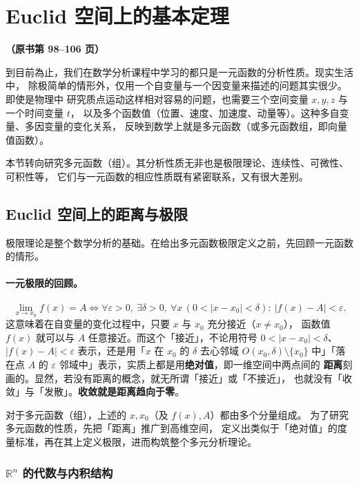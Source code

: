 \documentclass[11pt]{ctexart}
\theoremstyle{plain}
\theoremstyle{definition}
\theoremstyle{remark}
\newcommand{\srcnum}[1]{\textbf{#1}}
\begin{document}
\section{Euclid 空间上的基本定理}

\srcnum{（原书第 98--106 页）}

到目前為止，我们在数学分析课程中学习的都只是一元函数的分析性质。现实生活中，
除极简单的情形外，仅用一个自变量与一个因变量来描述的问题其实很少。即使是物理中
研究质点运动这样相对容易的问题，也需要三个空间变量 \(x,y,z\) 与一个时间变量 \(t\)，
以及多个函数值（位置、速度、加速度、动量等）。这种多自变量、多因变量的变化关系，
反映到数学上就是多元函数（或多元函数组，即向量值函数）。

本节转向研究多元函数（组）。其分析性质无非也是极限理论、连续性、可微性、可积性等，
它们与一元函数的相应性质既有紧密联系，又有很大差别。

\subsection{Euclid 空间上的距离与极限}

极限理论是整个数学分析的基础。在给出多元函数极限定义之前，先回顾一元函数的情形。

\paragraph{一元极限的回顾。}
\[
  \lim_{x\to x_0} f(x)=A
  \iff \forall \varepsilon>0,\ \exists\delta>0,\ \forall x\,(0<|x-x_0|<\delta):\
  |f(x)-A|<\varepsilon .
\]
这意味着在自变量的变化过程中，只要 \(x\) 与 \(x_0\) 充分接近（\(x\neq x_0\)），
函数值 \(f(x)\) 就可以与 \(A\) 任意接近。而这个「接近」，不论用符号
\(0<|x-x_0|<\delta\)、\(|f(x)-A|<\varepsilon\) 表示，还是用「\(x\) 在 \(x_0\) 的
\(\delta\) 去心邻域 \(O(x_0,\delta)\setminus\{x_0\}\) 中」「落在点 \(A\) 的
\(\varepsilon\) 邻域中」表示，实质上都是用\textbf{绝对值}，即一维空间中两点间的
\textbf{距离}刻画的。显然，若没有距离的概念，就无所谓「接近」或「不接近」，
也就没有「收敛」与「发散」。\textbf{收敛就是距离趋向于零}。

对于多元函数（组），上述的 \(x,x_0\)（及 \(f(x),A\)）都由多个分量组成。
为了研究多元函数的性质，先把「距离」推广到高维空间，
定义出类似于「绝对值」的度量标准，再在其上定义极限，进而构筑整个多元分析理论。

\subsubsection{\texorpdfstring{\(\mathbb{R}^n\) 的代数与内积结构}{Rn 的代数与内积结构}}
\end{document}
